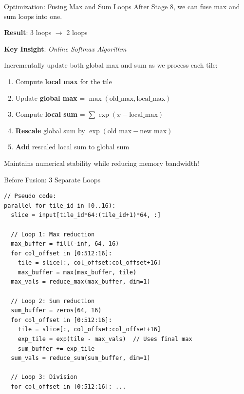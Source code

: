 \documentclass[aspectratio=169]{beamer}
\begin{document}
\begin{frame}{Optimization: Fusing Max and Sum Loops}
After Stage 8, we can fuse max and sum loops into one.

\textbf{Result}: 3 loops $\rightarrow$ 2 loops

\vspace{0.5cm}

\textbf{Key Insight}: \emph{Online Softmax Algorithm}

Incrementally update both global max and sum as we process each tile:

\begin{enumerate}
\item Compute \textbf{local max} for the tile
\item Update \textbf{global max} = $\max(\text{old\_max}, \text{local\_max})$
\item Compute \textbf{local sum} = $\sum \exp(x - \text{local\_max})$
\item \textbf{Rescale} global sum by $\exp(\text{old\_max} - \text{new\_max})$
\item \textbf{Add} rescaled local sum to global sum
\end{enumerate}

\vspace{0.3cm}

Maintains numerical stability while reducing memory bandwidth!
\end{frame}

\begin{frame}[fragile]{Before Fusion: 3 Separate Loops}
\begin{lstlisting}
// Pseudo code:
parallel for tile_id in [0..16):
  slice = input[tile_id*64:(tile_id+1)*64, :]

  // Loop 1: Max reduction
  max_buffer = fill(-inf, 64, 16)
  for col_offset in [0:512:16]:
    tile = slice[:, col_offset:col_offset+16]
    max_buffer = max(max_buffer, tile)
  max_vals = reduce_max(max_buffer, dim=1)

  // Loop 2: Sum reduction
  sum_buffer = zeros(64, 16)
  for col_offset in [0:512:16]:
    tile = slice[:, col_offset:col_offset+16]
    exp_tile = exp(tile - max_vals)  // Uses final max
    sum_buffer += exp_tile
  sum_vals = reduce_sum(sum_buffer, dim=1)

  // Loop 3: Division
  for col_offset in [0:512:16]: ...
\end{lstlisting}
\end{frame}
\end{document}
